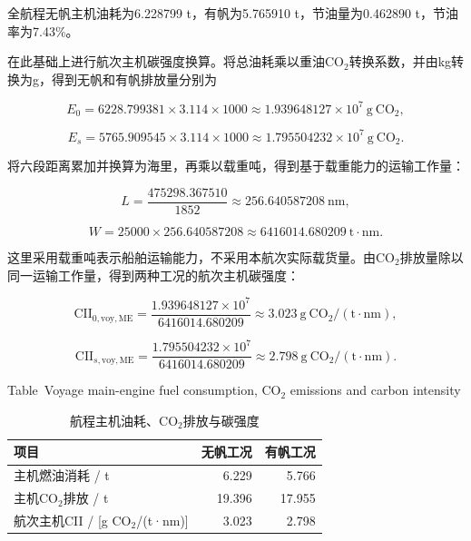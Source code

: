 \documentclass[UTF8,a4paper,twoside,zihao=5,fontset=windows]{ctexart}
\begin{document}
全航程无帆主机油耗为6.228799 t，有帆为5.765910 t，节油量为0.462890 t，节油率为7.43\%。

在此基础上进行航次主机碳强度换算。将总油耗乘以重油CO$_2$转换系数，并由kg转换为g，得到无帆和有帆排放量分别为

\begin{equation}
E_0=6228.799381\times3.114\times1000
\approx1.939648127\times10^7\ \mathrm{g\ CO_2},
\label{eq:case_numeric_2}
\end{equation}

\begin{equation}
E_s=5765.909545\times3.114\times1000
\approx1.795504232\times10^7\ \mathrm{g\ CO_2}.
\label{eq:case_numeric_3}
\end{equation}

将六段距离累加并换算为海里，再乘以载重吨，得到基于载重能力的运输工作量：

\begin{equation}
L=\frac{475298.367510}{1852}\approx256.640587208\ \mathrm{nm},
\label{eq:case_numeric_4}
\end{equation}

\begin{equation}
W=25000\times256.640587208
\approx6416014.680209\ \mathrm{t\cdot nm}.
\label{eq:case_numeric_5}
\end{equation}

这里采用载重吨表示船舶运输能力，不采用本航次实际载货量。由CO$_2$排放量除以同一运输工作量，得到两种工况的航次主机碳强度：

\begin{equation}
\mathrm{CII}_{0,\mathrm{voy,ME}}
=\frac{1.939648127\times10^7}{6416014.680209}
\approx3.023\ \mathrm{g\ CO_2/(t\cdot nm)},
\label{eq:case_numeric_6}
\end{equation}

\begin{equation}
\mathrm{CII}_{s,\mathrm{voy,ME}}
=\frac{1.795504232\times10^7}{6416014.680209}
\approx2.798\ \mathrm{g\ CO_2/(t\cdot nm)}.
\label{eq:case_numeric_7}
\end{equation}

\begin{table}[htbp]
\centering
\small
\setlength{\tabcolsep}{6pt}
\renewcommand{\arraystretch}{1.4}
\caption{航程主机油耗、CO$_2$排放与碳强度}
{\small Table~\thetable\quad Voyage main-engine fuel consumption, CO$_2$ emissions and carbon intensity\par}
\smallskip
\label{tab:case_cii}
\begin{tabular}{@{}lrr@{}}
\toprule
项目 & 无帆工况 & 有帆工况 \\
\midrule
主机燃油消耗 / t & 6.229 & 5.766 \\
主机CO$_2$排放 / t & 19.396 & 17.955 \\
航次主机CII / [g CO$_2$/(t·nm)] & 3.023 & 2.798 \\
\bottomrule
\end{tabular}
\end{table}
\FloatBarrier
\end{document}
